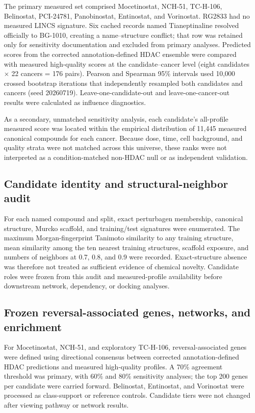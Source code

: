 The primary measured set comprised Mocetinostat, NCH-51, TC-H-106, Belinostat, PCI-24781, Panobinostat, Entinostat, and Vorinostat. RG2833 had no measured LINCS signature. Six cached records named Tianeptinaline resolved officially to BG-1010, creating a name--structure conflict; that row was retained only for sensitivity documentation and excluded from primary analyses. Predicted scores from the corrected annotation-defined HDAC ensemble were compared with measured high-quality scores at the candidate--cancer level (eight candidates $\times$ 22 cancers = 176 pairs). Pearson and Spearman 95\% intervals used 10,000 crossed bootstrap iterations that independently resampled both candidates and cancers (seed 20260719). Leave-one-candidate-out and leave-one-cancer-out results were calculated as influence diagnostics.

As a secondary, unmatched sensitivity analysis, each candidate's all-profile measured score was located within the empirical distribution of 11,445 measured canonical compounds for each cancer. Because dose, time, cell background, and quality strata were not matched across this universe, these ranks were not interpreted as a condition-matched non-HDAC null or as independent validation.

\subsection{Candidate identity and structural-neighbor audit}

For each named compound and split, exact perturbagen membership, canonical structure, Murcko scaffold, and training/test signatures were enumerated. The maximum Morgan-fingerprint Tanimoto similarity to any training structure, mean similarity among the ten nearest training structures, scaffold exposure, and numbers of neighbors at 0.7, 0.8, and 0.9 were recorded. Exact-structure absence was therefore not treated as sufficient evidence of chemical novelty. Candidate roles were frozen from this audit and measured-profile availability before downstream network, dependency, or docking analyses.

\subsection{Frozen reversal-associated genes, networks, and enrichment}

For Mocetinostat, NCH-51, and exploratory TC-H-106, reversal-associated genes were defined using directional consensus between corrected annotation-defined HDAC predictions and measured high-quality profiles. A 70\% agreement threshold was primary, with 60\% and 80\% sensitivity analyses; the top 200 genes per candidate were carried forward. Belinostat, Entinostat, and Vorinostat were processed as class-support or reference controls. Candidate tiers were not changed after viewing pathway or network results.

